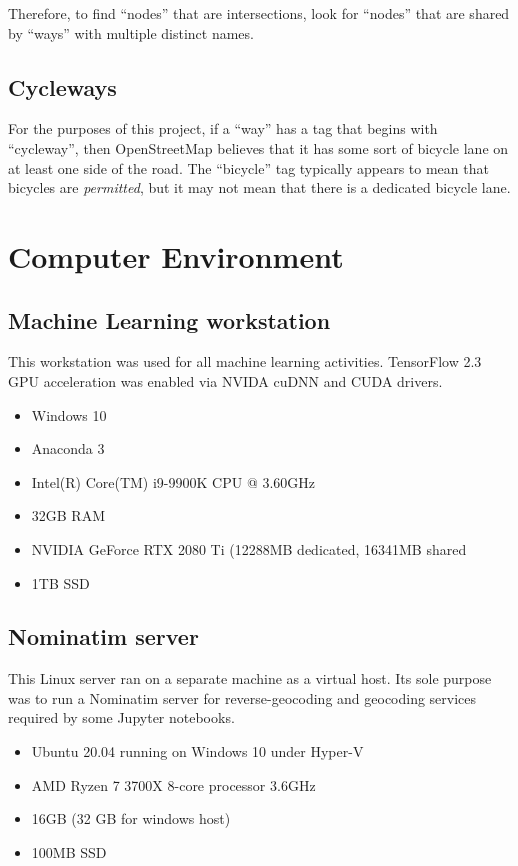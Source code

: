 \documentclass[11pt,twoside]{report}
\begin{document}
Therefore, to find ``nodes'' that are intersections, look for ``nodes'' that are shared by ``ways'' with multiple distinct names.

\section{Cycleways}
\label{osm:cycleways}

For the purposes of this project, if a ``way'' has a tag that begins with ``cycleway'', then OpenStreetMap believes that it has some sort of bicycle lane on at least one side of the road.  The ``bicycle'' tag typically appears to mean that bicycles are \textit{permitted}, but it may not mean that there is a dedicated bicycle lane.


\chapter{Computer Environment}
\label{a:environment}

\section{Machine Learning workstation}
\label{a:computer}

This workstation was used for all machine learning activities.  TensorFlow 2.3 GPU acceleration was enabled via NVIDA cuDNN and CUDA drivers.

\begin{itemize}
\item{Windows 10}
\item{Anaconda 3}
\item{Intel(R) Core(TM) i9-9900K CPU @ 3.60GHz}	
\item{32GB RAM}
\item{NVIDIA GeForce RTX 2080 Ti (12288MB dedicated, 16341MB shared}
\item{1TB SSD}
\end{itemize}


\section{Nominatim server}
\label{a:nominatim}

This Linux server ran on a separate machine as a virtual host.  Its sole purpose was to run a Nominatim server for reverse-geocoding
and geocoding services required by some Jupyter notebooks.

\begin{itemize}
\item{Ubuntu 20.04 running on Windows 10 under Hyper-V}
\item{AMD Ryzen 7 3700X 8-core processor 3.6GHz}
\item{16GB (32 GB for windows host)}
\item{100MB SSD}
\end{itemize}
\end{document}
